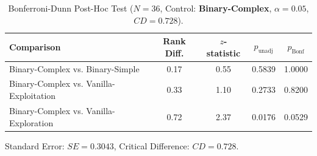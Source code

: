 \begin{table}[htbp]
  \centering
  \small
  \caption{Bonferroni-Dunn Post-Hoc Test ($N=36$, Control: \textbf{Binary-Complex}, $\alpha=0.05$, $CD=0.728$).}
  \label{tab:bonferroni_posthoc_inst15}
  \begin{tabular}{lcccc}
    \toprule
    \textbf{Comparison} & \textbf{Rank Diff.} & \textbf{$z$-statistic} & \textbf{$p_{\text{unadj}}$} & \textbf{$p_{\text{Bonf}}$} \\
    \midrule
    Binary-Complex vs. Binary-Simple       &   0.17 &  0.55 &  0.5839 &  1.0000 \\
    Binary-Complex vs. Vanilla-Exploitation &   0.33 &  1.10 &  0.2733 &  0.8200 \\
    Binary-Complex vs. Vanilla-Exploration &   0.72 &  2.37 &  0.0176 &  0.0529 \\
    \bottomrule
  \end{tabular}
  \vspace{1ex}

  \footnotesize Standard Error: $SE=0.3043$, Critical Difference: $CD=0.728$.
\end{table}

